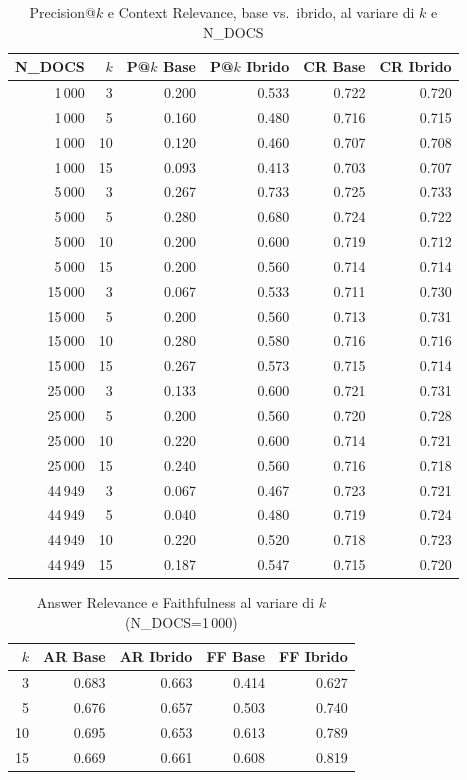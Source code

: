 \documentclass[12pt,a4paper]{article}
\begin{document}
\begin{table}[H]
  \centering
  \caption{Precision@$k$ e Context Relevance, base vs.\ ibrido, al variare di $k$ e N\_DOCS}
  \small
  \begin{tabular}{rrrrrr}
    \toprule
    \textbf{N\_DOCS} & \textbf{$k$} & \textbf{P@$k$ Base} & \textbf{P@$k$ Ibrido} & \textbf{CR Base} & \textbf{CR Ibrido} \\
    \midrule
    1\,000  & 3  & 0.200 & 0.533 & 0.722 & 0.720 \\
    1\,000  & 5  & 0.160 & 0.480 & 0.716 & 0.715 \\
    1\,000  & 10 & 0.120 & 0.460 & 0.707 & 0.708 \\
    1\,000  & 15 & 0.093 & 0.413 & 0.703 & 0.707 \\
    \midrule
    5\,000  & 3  & 0.267 & 0.733 & 0.725 & 0.733 \\
    5\,000  & 5  & 0.280 & 0.680 & 0.724 & 0.722 \\
    5\,000  & 10 & 0.200 & 0.600 & 0.719 & 0.712 \\
    5\,000  & 15 & 0.200 & 0.560 & 0.714 & 0.714 \\
    \midrule
    15\,000 & 3  & 0.067 & 0.533 & 0.711 & 0.730 \\
    15\,000 & 5  & 0.200 & 0.560 & 0.713 & 0.731 \\
    15\,000 & 10 & 0.280 & 0.580 & 0.716 & 0.716 \\
    15\,000 & 15 & 0.267 & 0.573 & 0.715 & 0.714 \\
    \midrule
    25\,000 & 3  & 0.133 & 0.600 & 0.721 & 0.731 \\
    25\,000 & 5  & 0.200 & 0.560 & 0.720 & 0.728 \\
    25\,000 & 10 & 0.220 & 0.600 & 0.714 & 0.721 \\
    25\,000 & 15 & 0.240 & 0.560 & 0.716 & 0.718 \\
    \midrule
    44\,949 & 3  & 0.067 & 0.467 & 0.723 & 0.721 \\
    44\,949 & 5  & 0.040 & 0.480 & 0.719 & 0.724 \\
    44\,949 & 10 & 0.220 & 0.520 & 0.718 & 0.723 \\
    44\,949 & 15 & 0.187 & 0.547 & 0.715 & 0.720 \\
    \bottomrule
  \end{tabular}
\end{table}

\begin{table}[H]
  \centering
  \caption{Answer Relevance e Faithfulness al variare di $k$ (N\_DOCS=1\,000)}
  \begin{tabular}{rrrrr}
    \toprule
    \textbf{$k$} & \textbf{AR Base} & \textbf{AR Ibrido} & \textbf{FF Base} & \textbf{FF Ibrido} \\
    \midrule
    3  & 0.683 & 0.663 & 0.414 & 0.627 \\
    5  & 0.676 & 0.657 & 0.503 & 0.740 \\
    10 & 0.695 & 0.653 & 0.613 & 0.789 \\
    15 & 0.669 & 0.661 & 0.608 & 0.819 \\
    \bottomrule
  \end{tabular}
\end{table}
\end{document}
